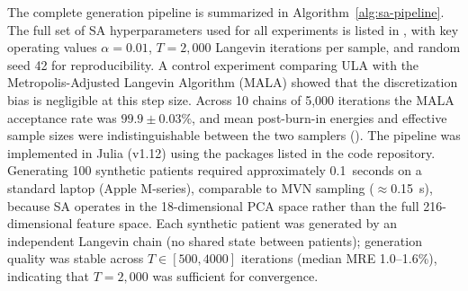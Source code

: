 The complete generation pipeline is summarized in Algorithm~\ref{alg:sa-pipeline}.
The full set of SA hyperparameters used for all experiments is listed in
, with key operating values $\alpha = 0.01$,
$T = 2{,}000$ Langevin iterations per sample, and random seed 42 for
reproducibility. A control experiment comparing ULA with the
Metropolis-Adjusted Langevin Algorithm (MALA) showed that the
discretization bias is negligible at this step size. Across 10 chains of
5{,}000 iterations the MALA acceptance rate was $99.9 \pm 0.03\%$, and mean
post-burn-in energies and effective sample sizes were indistinguishable
between the two samplers (). The pipeline was implemented in Julia (v1.12) using the packages listed in the code
repository. Generating 100 synthetic patients required approximately 0.1~seconds on
a standard laptop (Apple M-series), comparable to MVN sampling ($\approx$0.15~s),
because SA operates in the 18-dimensional PCA space rather than the full
216-dimensional feature space. Each synthetic patient was generated by an independent
Langevin chain (no shared state between patients); generation quality was stable
across $T \in [500, 4000]$ iterations (median MRE 1.0--1.6\%), indicating that
$T{=}2{,}000$ was sufficient for convergence.


